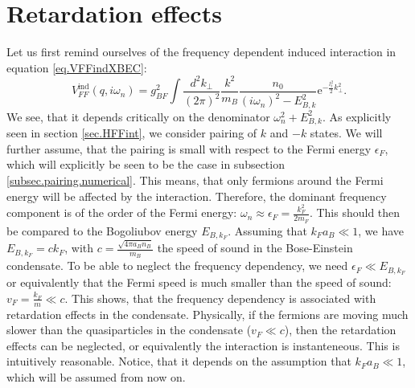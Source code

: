 \section{Retardation effects} \label{sec.RetardationEffects}
Let us first remind ourselves of the frequency dependent induced interaction in equation \eqref{eq.VFFindXBEC}:
\begin{equation}
V_{FF}^\text{ind}(q,i\omega_n) = g_{BF}^2\int\frac{d^2k_\perp}{(2\pi)^2}\frac{k^2}{m_B}\frac{n_0}{(i\omega_n)^2-E_{B,k}^2}\text{e}^{-\frac{l_t^2}{2}k_\perp^2}. \nonumber
\end{equation}
We see, that it depends critically on the denominator $\omega_n^2+E_{B,k}^2$. As explicitly seen in section \ref{sec.HFFint}, we consider pairing of $k$ and $-k$ states. We will further assume, that the pairing is small with respect to the Fermi energy $\epsilon_F$, which will explicitly be seen to be the case in subsection \ref{subsec.pairing.numerical}. This means, that only fermions around the Fermi energy will be affected by the interaction. Therefore, the dominant frequency component is of the order of the Fermi energy: $\omega_n \approx \epsilon_F = \frac{k_F^2}{2m_F}$. This should then be compared to the Bogoliubov energy $E_{B,k_F}$. Assuming that $k_Fa_B\ll 1$, we have $E_{B,k_F} = ck_F$, with $c =\frac{\sqrt{4\pi a_B n_B}}{m_B}$ the speed of sound in the Bose-Einstein condensate. To be able to neglect the frequency dependency, we need $\epsilon_F \ll E_{B,k_F}$ or equivalently that the Fermi speed is much smaller than the speed of sound: $v_F = \frac{k_F}{m}\ll c$. This shows, that the frequency dependency is associated with retardation effects in the condensate. Physically, if the fermions are moving much slower than the quasiparticles in the condensate ($v_F \ll c$), then the retardation effects can be neglected, or equivalently the interaction is instanteneous. This is intuitively reasonable. Notice, that it depends on the assumption that $k_Fa_B\ll 1$, which will be assumed from now on.

